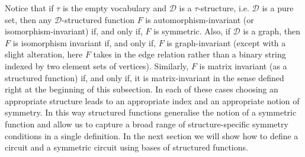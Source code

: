\documentclass[../paper.tex]{subfiles}
\begin{document}
Notice that if $\tau$ is the empty vocabulary and $\mathcal{D}$ is a
$\tau$-structure, i.e. $\mathcal{D}$ is a pure set, then any
$\mathcal{D}$-structured function $F$ is automorphism-invariant (or
isomorphism-invariant) if, and only if, $F$ is symmetric. Also, if $\mathcal{D}$
is a graph, then $F$ is isomorphism invariant if, and only if, $F$ is
graph-invariant (except with a slight alteration, here $F$ takes in the edge
relation rather than a binary string indexed by two element sets of vertices).
Similarly, $F$ is matrix invariant (as a structured function) if, and only if,
it is matrix-invariant in the sense defined right at the beginning of this
subsection. In each of these cases choosing an appropriate structure leads to an
appropriate index and an appropriate notion of symmetry. In this way structured
functions generalise the notion of a symmetric function and allow us to capture
a broad range of structure-specific symmetry conditions in a single definition.
In the next section we will show how to define a circuit and a symmetric circuit
using bases of structured functions.







\end{document}
